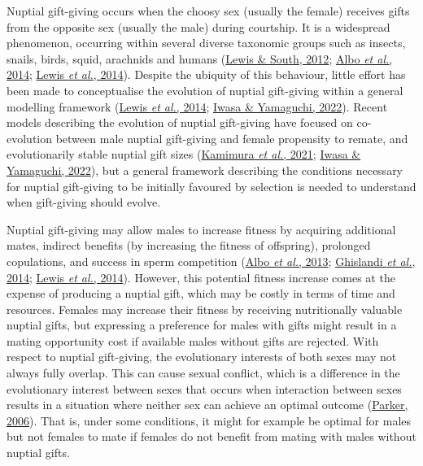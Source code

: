 \documentclass[
]{article}
\begin{document}
Nuptial gift-giving occurs when the choosy sex (usually the female)
receives gifts from the opposite sex (usually the male) during
courtship. It is a widespread phenomenon, occurring within several
diverse taxonomic groups such as insects, snails, birds, squid,
arachnids and humans (\protect\hyperlink{ref-Lewis2012}{Lewis \& South,
2012}; \protect\hyperlink{ref-Albo2014}{Albo \emph{et al.}, 2014};
\protect\hyperlink{ref-Lewis2014}{Lewis \emph{et al.}, 2014}). Despite
the ubiquity of this behaviour, little effort has been made to
conceptualise the evolution of nuptial gift-giving within a general
modelling framework (\protect\hyperlink{ref-Lewis2014}{Lewis \emph{et
al.}, 2014}; \protect\hyperlink{ref-Iwasa2022}{Iwasa \& Yamaguchi,
2022}). Recent models describing the evolution of nuptial gift-giving
have focused on co-evolution between male nuptial gift-giving and female
propensity to remate, and evolutionarily stable nuptial gift sizes
(\protect\hyperlink{ref-Kamimura2021}{Kamimura \emph{et al.}, 2021};
\protect\hyperlink{ref-Iwasa2022}{Iwasa \& Yamaguchi, 2022}), but a
general framework describing the conditions necessary for nuptial
gift-giving to be initially favoured by selection is needed to
understand when gift-giving should evolve.

Nuptial gift-giving may allow males to increase fitness by acquiring
additional mates, indirect benefits (by increasing the fitness of
offspring), prolonged copulations, and success in sperm competition
(\protect\hyperlink{ref-Albo2013}{Albo \emph{et al.}, 2013};
\protect\hyperlink{ref-Ghislandi2014}{Ghislandi \emph{et al.}, 2014};
\protect\hyperlink{ref-Lewis2014}{Lewis \emph{et al.}, 2014}). However,
this potential fitness increase comes at the expense of producing a
nuptial gift, which may be costly in terms of time and resources.
Females may increase their fitness by receiving nutritionally valuable
nuptial gifts, but expressing a preference for males with gifts might
result in a mating opportunity cost if available males without gifts are
rejected. With respect to nuptial gift-giving, the evolutionary
interests of both sexes may not always fully overlap. This can cause
sexual conflict, which is a difference in the evolutionary interest
between sexes that occurs when interaction between sexes results in a
situation where neither sex can achieve an optimal outcome
(\protect\hyperlink{ref-Parker2006}{Parker, 2006}). That is, under some
conditions, it might for example be optimal for males but not females to
mate if females do not benefit from mating with males without nuptial
gifts.
\end{document}
